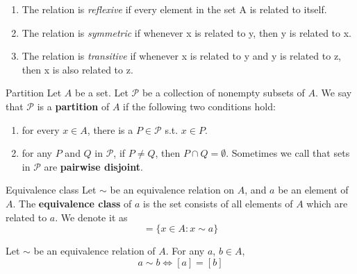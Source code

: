 \begin{remarks}
    \begin{enumerate}

        \item The relation is \textit{reflexive} if every element in the set A is related to itself.
        \item The relation is \textit{symmetric} if whenever x is related to y, then y is related to x.
        \item The relation is \textit{transitive} if whenever x is related to y and y is related to z, then x is also related to z.

    \end{enumerate}
\end{remarks}

\begin{definition}{Partition}{}
    Let $A$ be a set. Let $\mathcal{P}$ be a collection of nonempty subsets of $A$. We say that $\mathcal{P}$ is a \textbf{partition} of $A$ if the following two conditions hold:
    \begin{enumerate}

        \item for every $x \in A$, there is a $P \in \mathcal{P}$ s.t. $x \in P$.
        \item for any $P$ and $Q$ in $\mathcal{P}$, if $P \neq Q$, then $P \cap Q = \emptyset$. Sometimes we call that sets in $\mathcal{P}$ are \textbf{pairwise disjoint}.    

    \end{enumerate}
\end{definition}
    
\begin{definition}{Equivalence class}{}
    Let $\sim$ be an equivalence relation on $A$, and $a$ be an element of $A$. The \textbf{equivalence class} of $a$ is the set consists of all elements of $A$ which are related to $a$. We denote it as
    \begin{equation*}
        [a] = \{x \in A: x \sim a\}
    \end{equation*}
\end{definition}

\begin{theorem}{}{}
    Let $\sim$ be an equivalence relation of $A$. For any $a$, $b \in A$,
    \begin{equation*}
        a \sim b \iff [a] = [b]
    \end{equation*}
\end{theorem}

